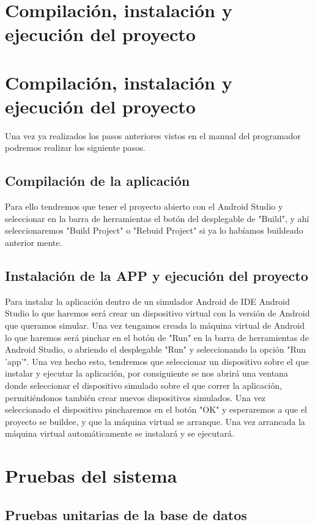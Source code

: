 \section{Compilación, instalación y ejecución del proyecto}
\section{Compilación, instalación y ejecución del proyecto}
Una vez ya realizados los pasos anteriores vistos en el manual del programador podremos realizar los siguiente pasos.
\subsection{Compilación de la aplicación}
Para ello tendremos que tener el proyecto abierto con el Android Studio y seleccionar en la barra de herramientas el botón del desplegable de "Build", y ahí seleccionaremos "Build Project" o "Rebuid Project" si ya lo habíamos buildeado anterior mente.
\subsection{Instalación de la APP y ejecución del proyecto}
Para instalar la aplicación dentro de un simulador Android de IDE Android Studio lo que haremos será crear un dispositivo virtual con la versión de Android que queramos simular. Una vez tengamos creada la máquina virtual de Android lo que haremos será pinchar en el botón de "Run" en la barra de herramientas de Android Studio, o abriendo el desplegable "Run" y seleccionando la opción "Run 'app'". Una vez hecho esto, tendremos que seleccionar un dispositivo sobre el que instalar y ejecutar la aplicación, por consiguiente se nos abrirá una ventana donde seleccionar el dispositivo simulado sobre el que correr la aplicación, permitiéndonos también crear nuevos dispositivos simulados. Una vez seleccionado el dispositivo pincharemos en el botón "OK" y esperaremos a que el proyecto se buildee, y que la máquina virtual se arranque. Una vez arrancada la máquina virtual automáticamente se instalará y se ejecutará.
\section{Pruebas del sistema}

\subsection{Pruebas unitarias de la base de datos}

